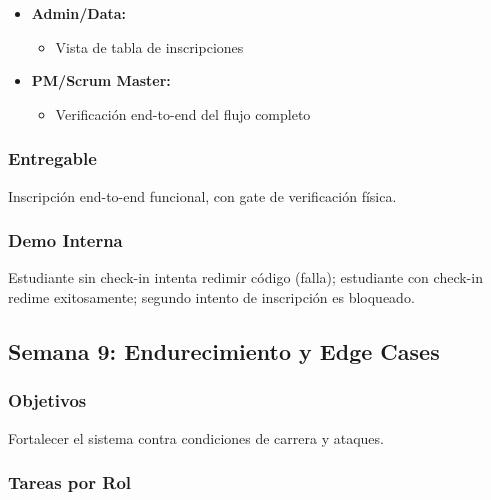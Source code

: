 \documentclass[12pt,a4paper]{article}
\begin{document}
\begin{itemize}[leftmargin=*]
    \item \textbf{Admin/Data:}
    \begin{itemize}
        \item Vista de tabla de inscripciones
    \end{itemize}
    
    \item \textbf{PM/Scrum Master:}
    \begin{itemize}
        \item Verificación end-to-end del flujo completo
    \end{itemize}
\end{itemize}

\subsubsection{Entregable}
Inscripción end-to-end funcional, con gate de verificación física.

\subsubsection{Demo Interna}
Estudiante sin check-in intenta redimir código (falla); estudiante con check-in redime exitosamente; segundo intento de inscripción es bloqueado.

\subsection{Semana 9: Endurecimiento y Edge Cases}

\subsubsection{Objetivos}
Fortalecer el sistema contra condiciones de carrera y ataques.

\subsubsection{Tareas por Rol}
\end{document}
